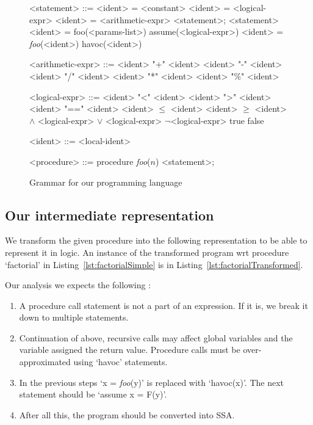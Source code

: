 \documentclass{llncs}
\newcommand{\foo}{\textit{foo}}
\newcommand{\n}{\textit{n}}
\begin{document}
\begin{figure}[hb!]
  \begin{grammar}
    <statement> ::= <ident> = <constant>
    \alt <ident> = <logical-expr>
    \alt <ident> = <arithmetic-expr>
    \alt <statement>; <statement>
    \alt <ident> = foo(<params-list>)
    \alt assume(<logical-expr>)
    \alt <ident> = \foo(<ident>)
    \alt havoc(<ident>)


    <arithmetic-expr> ::= <ident> "+" <ident>
    \alt <ident> "-" <ident>
    \alt <ident> "/" <ident>
    \alt <ident> "*" <ident>
    \alt <ident> "\%" <ident>
 
    <logical-expr> ::= <ident> "<" <ident>
    \alt <ident> ">" <ident>
    \alt <ident> "==" <ident>
    \alt <ident> $\leq$ <ident>
    \alt <ident> $\geq$ <ident>
     $\wedge$ <logical-expr>
     $\vee$ <logical-expr>
    \alt $\neg$<logical-expr>
    \alt true
    \alt false

    <ident> ::= <local-ident>
    
    <procedure> ::= procedure \foo ($\n$) {<statement>;}
  \end{grammar}
  \caption{Grammar for our programming language}
  \label{fig:grammar}
\end{figure}

\subsection{Our intermediate representation}\label{sec:intermediate}
We transform the given procedure into the following representation to be able
to represent it in logic. An instance of the transformed program wrt
procedure `factorial' in Listing~\ref{lst:factorialSimple} is in
Listing~\ref{lst:factorialTransformed}.

Our analysis we expects the following :
\begin{enumerate}
\item A procedure call statement is not a part of an expression. If
  it is, we break it down to multiple statements.
\item Continuation of above, recursive calls may affect global
  variables and the variable assigned the return value. Procedure
  calls must be over-approximated using `havoc' statements.
\item In the previous steps `x = \foo(y)' is replaced with
  `havoc(x)'. The next statement should be `assume x = F(y)'.
\item After all this, the program should be converted into SSA.
\end{enumerate}
\end{document}
